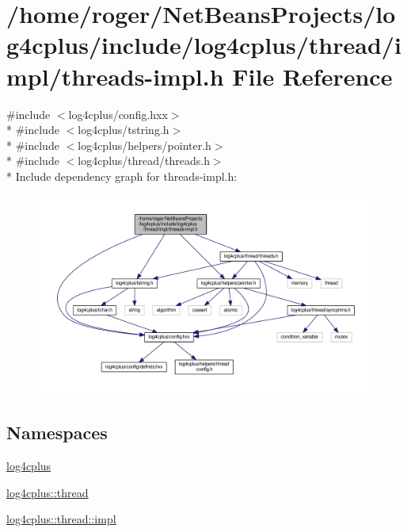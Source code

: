 \hypertarget{threads-impl_8h}{\section{/home/roger/\-Net\-Beans\-Projects/log4cplus/include/log4cplus/thread/impl/threads-\/impl.h File Reference}
\label{threads-impl_8h}
}
{\ttfamily \#include $<$log4cplus/config.\-hxx$>$}\\*
{\ttfamily \#include $<$log4cplus/tstring.\-h$>$}\\*
{\ttfamily \#include $<$log4cplus/helpers/pointer.\-h$>$}\\*
{\ttfamily \#include $<$log4cplus/thread/threads.\-h$>$}\\*
Include dependency graph for threads-\/impl.h\-:
\nopagebreak
\begin{figure}[H]
\begin{center}
\leavevmode
\includegraphics[width=350pt]{threads-impl_8h__incl}
\end{center}
\end{figure}
\subsection*{Namespaces}
\begin{DoxyCompactItemize}
\item 
\hyperlink{namespacelog4cplus}{log4cplus}
\item 
\hyperlink{namespacelog4cplus_1_1thread}{log4cplus\-::thread}
\item 
\hyperlink{namespacelog4cplus_1_1thread_1_1impl}{log4cplus\-::thread\-::impl}
\end{DoxyCompactItemize}
